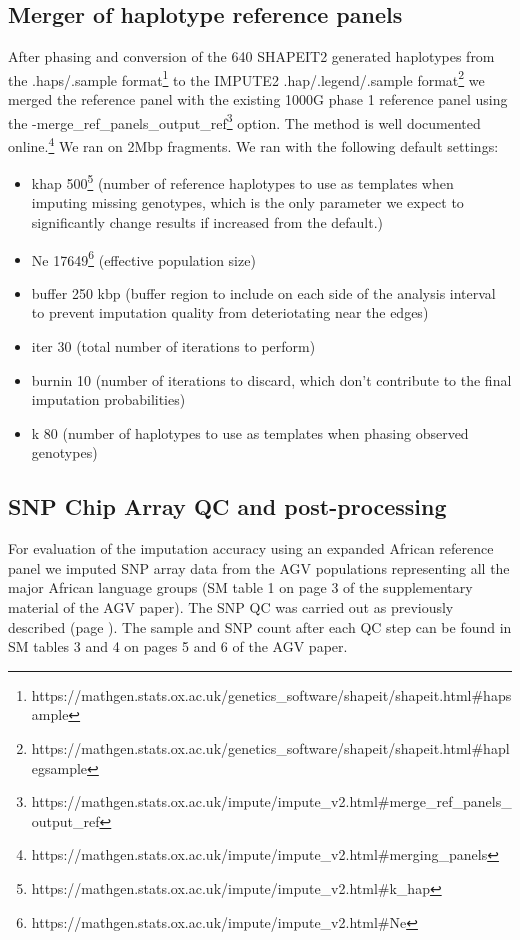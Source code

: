 \subsection{Merger of haplotype reference panels}
\label{subsec:panel_merger}
After phasing and conversion of the 640 SHAPEIT2 generated haplotypes from the .haps/.sample format\footnote{https://mathgen.stats.ox.ac.uk/genetics\_software/shapeit/shapeit.html\#hapsample} to the IMPUTE2 .hap/.legend/.sample format\footnote{https://mathgen.stats.ox.ac.uk/genetics\_software/shapeit/shapeit.html\#haplegsample} we merged the reference panel with the existing \gls{1000G} phase 1 reference panel using the -{}\-merge\_ref\_panels\_output\_ref\footnote{https://mathgen.stats.ox.ac.uk/impute/impute\_v2.html\#\-merge\_ref\_panels\_output\_ref} option.
The method is well documented online.\footnote{https://mathgen.stats.ox.ac.uk/impute/impute\_v2.html\#merging\_panels}
We ran on 2\gls{Mbp} fragments. We ran with the following default settings:
\begin{itemize}
\item \-khap 500\footnote{https://mathgen.stats.ox.ac.uk/impute/impute\_v2.html\#\-k\_hap} (number of reference haplotypes to use as templates when imputing missing genotypes, which is the only parameter we expect to significantly change results if increased from the default.)
\item \-Ne 17649\footnote{https://mathgen.stats.ox.ac.uk/impute/impute\_v2.html\#\-Ne} (effective population size\cite{Wright01031931}\cite{Wright1938})
\item \-buffer 250 \gls{kbp} (buffer region to include on each side of the analysis interval to prevent imputation quality from deteriotating near the edges)
\item \-iter 30 (total number of iterations to perform)
\item \-burnin 10 (number of iterations to discard, which don't contribute to the final imputation probabilities)
\item \-k 80 (number of haplotypes to use as templates when phasing observed genotypes)
\end{itemize}




\subsection{SNP Chip Array QC and post-processing}

For evaluation of the imputation accuracy using an expanded African reference panel we imputed SNP array data from the \gls{AGV} populations representing all the major African language groups (SM table 1 on page 3 of the supplementary material of the \gls{AGV} paper).\cite{Gurdasani2015}
The \gls{SNP} \gls{QC} was carried out as previously described (page \pageref{subsec:chipQC}). The sample and \gls{SNP} count after each \gls{QC} step can be found in SM tables 3 and 4 on pages 5 and 6 of the \gls{AGV} paper.\cite{Gurdasani2015}


